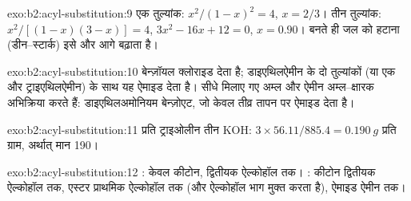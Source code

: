 \begin{solution}{exo:b2:acyl-substitution:9}
एक तुल्यांक: $x^2/(1 - x)^2 = 4$, $x = 2/3$। तीन तुल्यांक: $x^2/[(1 - x)(3 - x)] = 4$, $3x^2 - 16x
+ 12 = 0$, $x = 0.90$। बनते ही जल को हटाना (डीन--स्टार्क) इसे और आगे बढ़ाता है।
\end{solution}

\begin{solution}{exo:b2:acyl-substitution:10}
 बेन्ज़ॉयल क्लोराइड देता है; डाइएथिलऐमीन के दो तुल्यांकों (या एक और ट्राइएथिलऐमीन) के साथ
यह ऐमाइड देता है। सीधे मिलाए गए अम्ल और ऐमीन अम्ल--क्षारक अभिक्रिया करते हैं: डाइएथिलअमोनियम
बेन्ज़ोएट, जो केवल तीव्र तापन पर ऐमाइड देता है।
\end{solution}

\begin{solution}{exo:b2:acyl-substitution:11}
प्रति ट्राइओलीन तीन KOH: $3 \times 56.11/885.4 = \qty{0.190}{g}$ प्रति ग्राम, अर्थात्  मान
190।
\end{solution}

\begin{solution}{exo:b2:acyl-substitution:12}
: केवल कीटोन, द्वितीयक ऐल्कोहॉल तक। : कीटोन द्वितीयक
ऐल्कोहॉल तक, एस्टर प्राथमिक ऐल्कोहॉल तक (और ऐल्कोहॉल भाग मुक्त करता है), ऐमाइड ऐमीन तक।
\end{solution}

